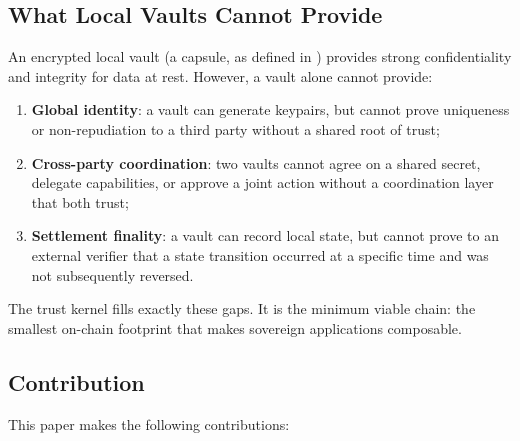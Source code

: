 \subsection{What Local Vaults Cannot Provide}

An encrypted local vault (a capsule, as defined in \cite{lux-capsule-architecture})
provides strong confidentiality and integrity for data at rest. However, a vault alone
cannot provide:

\begin{enumerate}[label=(\roman*)]
    \item \textbf{Global identity}: a vault can generate keypairs, but cannot prove
          uniqueness or non-repudiation to a third party without a shared root of trust;
    \item \textbf{Cross-party coordination}: two vaults cannot agree on a shared secret,
          delegate capabilities, or approve a joint action without a coordination layer
          that both trust;
    \item \textbf{Settlement finality}: a vault can record local state, but cannot
          prove to an external verifier that a state transition occurred at a specific
          time and was not subsequently reversed.
\end{enumerate}

The trust kernel fills exactly these gaps. It is the minimum viable chain: the smallest
on-chain footprint that makes sovereign applications composable.

\subsection{Contribution}

This paper makes the following contributions:

